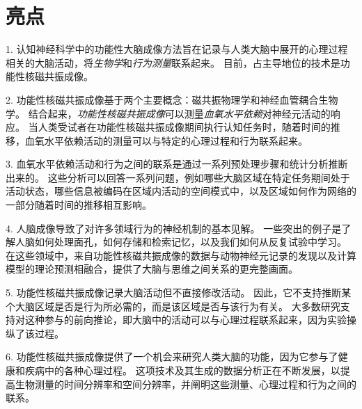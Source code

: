 \section{亮点}

1. 认知神经科学中的功能性大脑成像方法旨在记录与人类大脑中展开的心理过程相关的大脑活动，将\textit{生物学}和\textit{行为测量}联系起来。
目前，占主导地位的技术是功能性核磁共振成像。


2. 功能性核磁共振成像基于两个主要概念：磁共振物理学和神经血管耦合生物学。
结合起来，\textit{功能性核磁共振成像}可以测量\textit{血氧水平依赖}对神经元活动的响应。
当人类受试者在功能性核磁共振成像期间执行认知任务时，随着时间的推移，血氧水平依赖活动的测量可以与特定的心理过程和行为联系起来。

3. 血氧水平依赖活动和行为之间的联系是通过一系列预处理步骤和统计分析推断出来的。
这些分析可以回答一系列问题，例如哪些大脑区域在特定任务期间处于活动状态，哪些信息被编码在区域内活动的空间模式中，以及区域如何作为网络的一部分随着时间的推移相互影响。


4. 人脑成像导致了对许多领域行为的神经机制的基本见解。
一些突出的例子是了解人脑如何处理面孔，如何存储和检索记忆，以及我们如何从反复试验中学习。
在这些领域中，来自功能性核磁共振成像的数据与动物神经元记录的发现以及计算模型的理论预测相融合，提供了大脑与思维之间关系的更完整画面。


5. 功能性核磁共振成像记录大脑活动但不直接修改活动。
因此，它不支持推断某个大脑区域是否是行为所必需的，而是该区域是否与该行为有关。
大多数研究支持对这种参与的前向推论，即大脑中的活动可以与心理过程联系起来，因为实验操纵了该过程。


6. 功能性核磁共振成像提供了一个机会来研究人类大脑的功能，因为它参与了健康和疾病中的各种心理过程。 
这项技术及其生成的数据分析正在不断发展，以提高生物测量的时间分辨率和空间分辨率，并阐明这些测量、心理过程和行为之间的联系。


